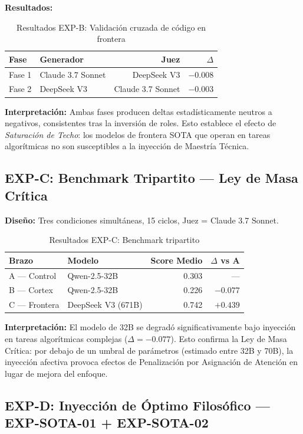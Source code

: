 \documentclass[12pt, a4paper]{article}
\begin{document}
\textbf{Resultados:}
\begin{table}[h]
\centering
\begin{tabular}{llrr}
\toprule
Fase & Generador & Juez & $\Delta$ \\
\midrule
Fase 1 & Claude 3.7 Sonnet & DeepSeek V3 & $-0.008$ \\
Fase 2 & DeepSeek V3 & Claude 3.7 Sonnet & $-0.003$ \\
\bottomrule
\end{tabular}
\caption{Resultados EXP-B: Validación cruzada de código en frontera}
\end{table}

\textbf{Interpretación:} Ambas fases producen deltas estadísticamente neutros a negativos, consistentes tras la inversión de roles. Esto establece el efecto de \textit{Saturación de Techo}: los modelos de frontera SOTA que operan en tareas algorítmicas no son susceptibles a la inyección de Maestría Técnica.

\subsection{EXP-C: Benchmark Tripartito — Ley de Masa Crítica}
\textbf{Diseño:} Tres condiciones simultáneas, 15 ciclos, Juez = Claude 3.7 Sonnet.

\begin{table}[h]
\centering
\begin{tabular}{llrr}
\toprule
Brazo & Modelo & Score Medio & $\Delta$ vs A \\
\midrule
A — Control & Qwen-2.5-32B & 0.303 & — \\
B — Cortex & Qwen-2.5-32B & 0.226 & $-0.077$ \\
C — Frontera & DeepSeek V3 (671B) & 0.742 & $+0.439$ \\
\bottomrule
\end{tabular}
\caption{Resultados EXP-C: Benchmark tripartito}
\end{table}

\textbf{Interpretación:} El modelo de 32B se degradó significativamente bajo inyección en tareas algorítmicas complejas ($\Delta = -0.077$). Esto confirma la Ley de Masa Crítica: por debajo de un umbral de parámetros (estimado entre 32B y 70B), la inyección afectiva provoca efectos de Penalización por Asignación de Atención en lugar de mejora del enfoque.

\subsection{EXP-D: Inyección de Óptimo Filosófico — EXP-SOTA-01 + EXP-SOTA-02}
\end{document}
